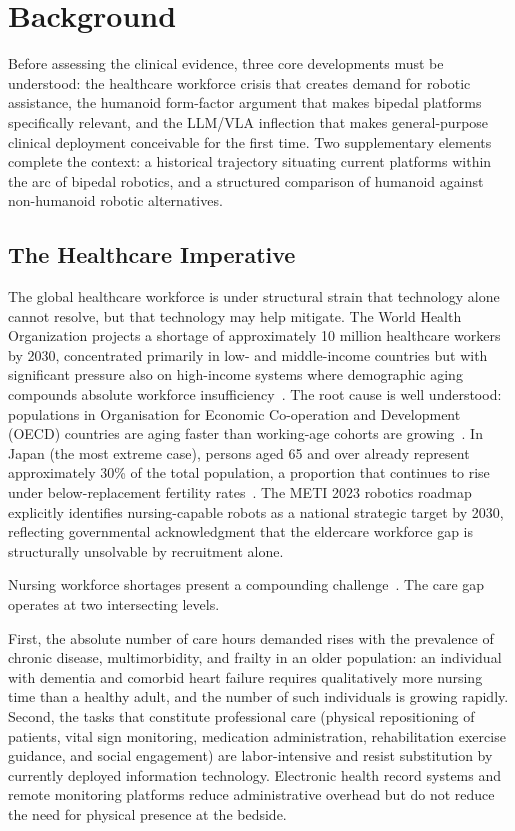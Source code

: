 \documentclass[acmjour]{acmart}
\begin{document}
\section{Background}
\label{sec:background}

Before assessing the clinical evidence, three core developments must be
understood: the healthcare workforce crisis that creates demand for robotic
assistance, the humanoid form-factor argument that makes bipedal platforms
specifically relevant, and the LLM/VLA inflection that makes general-purpose
clinical deployment conceivable for the first time. Two supplementary elements
complete the context: a historical trajectory situating current platforms within
the arc of bipedal robotics, and a structured comparison of humanoid against
non-humanoid robotic alternatives.

\subsection{The Healthcare Imperative}
\label{sec:imperative}

The global healthcare workforce is under structural strain that technology alone
cannot resolve, but that technology may help mitigate. The World Health
Organization projects a shortage of approximately 10 million healthcare workers
by 2030, concentrated primarily in low- and middle-income countries but with
significant pressure also on high-income systems where demographic aging compounds
absolute workforce insufficiency~\cite{who2016workforce}. The root cause is well
understood: populations in Organisation for Economic Co-operation and Development
(OECD) countries are aging faster than working-age cohorts are
growing~\cite{oecd2023health}. In Japan (the most extreme case), persons aged 65
and over already represent approximately 30\% of the total population, a
proportion that continues to rise under below-replacement fertility
rates~\cite{japancabinet2023}. The METI 2023 robotics roadmap explicitly
identifies nursing-capable robots as a national strategic target by 2030,
reflecting governmental acknowledgment that the eldercare workforce gap is
structurally unsolvable by recruitment alone.

Nursing workforce shortages present a compounding challenge~\cite{lasater2021}.
The care gap operates at two intersecting levels.

First, the absolute number of
care hours demanded rises with the prevalence of chronic disease, multimorbidity,
and frailty in an older population: an individual with dementia and comorbid
heart failure requires qualitatively more nursing time than a healthy adult, and
the number of such individuals is growing rapidly. Second, the tasks that
constitute professional care (physical repositioning of patients, vital sign
monitoring, medication administration, rehabilitation exercise guidance, and
social engagement) are labor-intensive and resist substitution by currently
deployed information technology. Electronic health record systems and remote
monitoring platforms reduce administrative overhead but do not reduce the need
for physical presence at the bedside.
\end{document}
